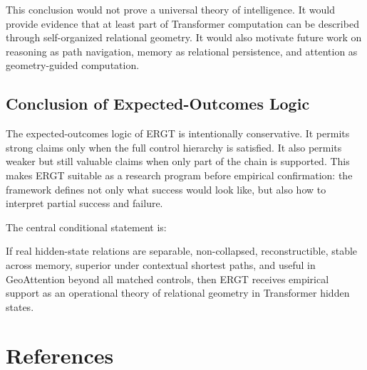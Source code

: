 \documentclass[11pt]{article}
\begin{document}
This conclusion would not prove a universal theory of intelligence. It would provide evidence that at least part of Transformer computation can be described through self-organized relational geometry. It would also motivate future work on reasoning as path navigation, memory as relational persistence, and attention as geometry-guided computation.

\subsection{Conclusion of Expected-Outcomes Logic}

The expected-outcomes logic of ERGT is intentionally conservative. It permits strong claims only when the full control hierarchy is satisfied. It also permits weaker but still valuable claims when only part of the chain is supported. This makes ERGT suitable as a research program before empirical confirmation: the framework defines not only what success would look like, but also how to interpret partial success and failure.

The central conditional statement is:
\begin{ergtclaim}
If real hidden-state relations are separable, non-collapsed, reconstructible, stable across memory, superior under contextual shortest paths, and useful in GeoAttention beyond all matched controls, then ERGT receives empirical support as an operational theory of relational geometry in Transformer hidden states.
\end{ergtclaim}



\section*{References}
\end{document}
